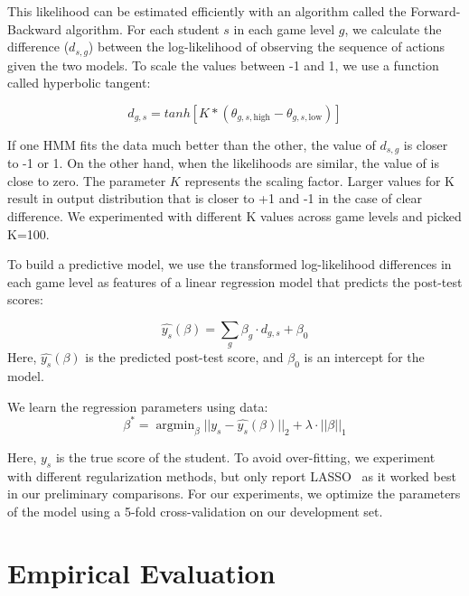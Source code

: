 \documentclass{sigchi}
\DeclareMathOperator*{\argmin}{argmin}
\begin{document}
	This likelihood can be estimated efficiently with an algorithm called the Forward-Backward algorithm. 
	For each student $s$ in each game level $g$, we calculate the difference ($d_{s,g}$) between the log-likelihood of observing the sequence of actions given the two models. 
	To scale the values between -1 and 1, we use a function called hyperbolic tangent: 
	
	\begin{equation}
	d_{g,s} = tanh[ K * (\theta_{g, s, \text{high}} - \theta_{g, s, \text{low}})]
	\end{equation}
	
 	If one HMM fits the data much better than the other, the value of $d_{s,g}$ is closer to -1 or 1.
	On the other hand, when the likelihoods are similar,  the value of is close to zero. 
	The parameter $K$ represents the scaling factor.
	Larger values for K result in output distribution that is closer to +1 and -1 in the case of clear difference.
	We experimented with different K values across game levels and picked K=100.

	To build a predictive model,  we use the transformed log-likelihood differences in each game level as features of a linear regression model that predicts the post-test scores:

	\begin{equation}
	\hat {y_s}(\beta) =   \sum_g \beta_g \cdot d_{g,s}  + \beta_0
	\end{equation}
	Here, $\hat {y_s}(\beta)$ is the predicted post-test score, and $\beta_0$ is an intercept for the  model.  
	
	We learn the regression parameters using data:
	\begin{equation}
	\beta^* = \argmin_\beta || y_s - \hat{y_s}(\beta)  ||_2 + \lambda \cdot || \beta ||_1
	\end{equation}
	
	Here, $y_s$ is the true score of the student.
	To avoid over-fitting, we experiment with different regularization methods, but only report LASSO~\cite{tibshirani1996regression} as it worked best in our preliminary comparisons.
	For our experiments, we optimize the parameters of the model using a 5-fold cross-validation on our development set.

	
	\section{Empirical Evaluation}
	\label{sec:experiments}
	
\end{document}
